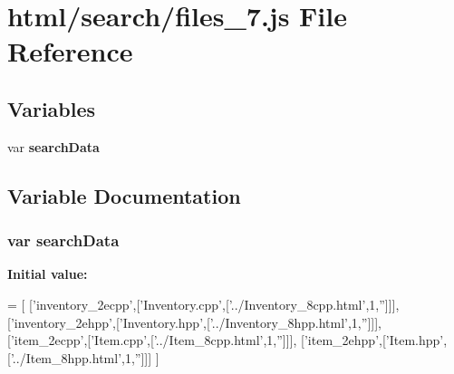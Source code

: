 \section{html/search/files\-\_\-7.js File Reference}
\label{files__7_8js}
\subsection*{Variables}
\begin{DoxyCompactItemize}
\item 
var {\bf search\-Data}
\end{DoxyCompactItemize}


\subsection{Variable Documentation}
\subsubsection[{search\-Data}]{\setlength{\rightskip}{0pt plus 5cm}var search\-Data}\label{files__7_8js_ad01a7523f103d6242ef9b0451861231e}
{\bfseries Initial value\-:}
\begin{DoxyCode}
=
[
  [\textcolor{stringliteral}{'inventory\_2ecpp'},[\textcolor{stringliteral}{'Inventory.cpp'},[\textcolor{stringliteral}{'../Inventory\_8cpp.html'},1,\textcolor{stringliteral}{''}]]],
  [\textcolor{stringliteral}{'inventory\_2ehpp'},[\textcolor{stringliteral}{'Inventory.hpp'},[\textcolor{stringliteral}{'../Inventory\_8hpp.html'},1,\textcolor{stringliteral}{''}]]],
  [\textcolor{stringliteral}{'item\_2ecpp'},[\textcolor{stringliteral}{'Item.cpp'},[\textcolor{stringliteral}{'../Item\_8cpp.html'},1,\textcolor{stringliteral}{''}]]],
  [\textcolor{stringliteral}{'item\_2ehpp'},[\textcolor{stringliteral}{'Item.hpp'},[\textcolor{stringliteral}{'../Item\_8hpp.html'},1,\textcolor{stringliteral}{''}]]]
]
\end{DoxyCode}
